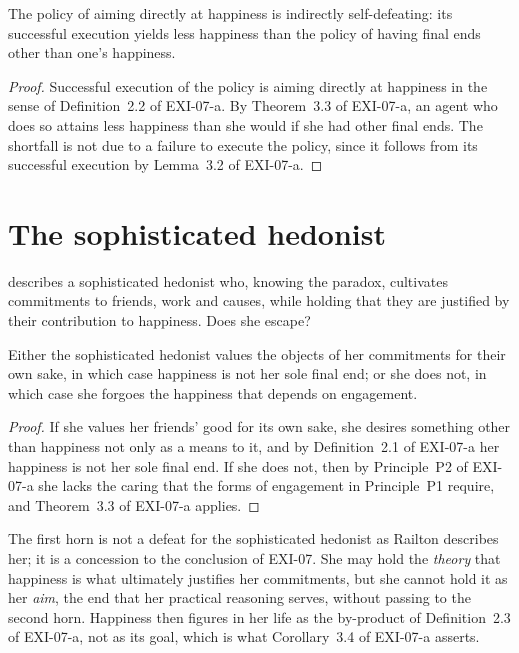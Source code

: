 \documentclass{situationist-preprint}
\begin{document}
\begin{proposition}\label{p:indirect}
The policy of aiming directly at happiness is indirectly self-defeating: its successful execution yields less happiness than the policy of having final ends other than one's happiness.
\end{proposition}

\begin{proof}
Successful execution of the policy is aiming directly at happiness in the sense of Definition~2.2 of EXI-07-a. By Theorem~3.3 of EXI-07-a, an agent who does so attains less happiness than she would if she had other final ends. The shortfall is not due to a failure to execute the policy, since it follows from its successful execution by Lemma~3.2 of EXI-07-a.
\end{proof}

\section{The sophisticated hedonist}

\citet{Railton1984} describes a sophisticated hedonist who, knowing the paradox, cultivates commitments to friends, work and causes, while holding that they are justified by their contribution to happiness. Does she escape?

\begin{proposition}\label{p:dilemma}
Either the sophisticated hedonist values the objects of her commitments for their own sake, in which case happiness is not her sole final end; or she does not, in which case she forgoes the happiness that depends on engagement.
\end{proposition}

\begin{proof}
If she values her friends' good for its own sake, she desires something other than happiness not only as a means to it, and by Definition~2.1 of EXI-07-a her happiness is not her sole final end. If she does not, then by Principle~P2 of EXI-07-a she lacks the caring that the forms of engagement in Principle~P1 require, and Theorem~3.3 of EXI-07-a applies.
\end{proof}

The first horn is not a defeat for the sophisticated hedonist as Railton describes her; it is a concession to the conclusion of EXI-07. She may hold the \emph{theory} that happiness is what ultimately justifies her commitments, but she cannot hold it as her \emph{aim}, the end that her practical reasoning serves, without passing to the second horn. Happiness then figures in her life as the by-product of Definition~2.3 of EXI-07-a, not as its goal, which is what Corollary~3.4 of EXI-07-a asserts.
\end{document}
